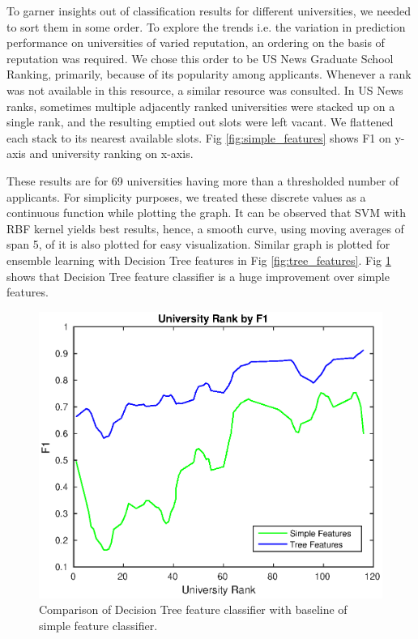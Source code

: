 \documentclass{sig-alternate-05-2015}
\begin{document}
To garner insights out of classification results for different universities, we needed to sort them in some order. To explore the trends i.e. the variation in prediction performance on universities of varied reputation, an ordering on the basis of reputation was required. We chose this order to be US News Graduate School Ranking, primarily, because of its popularity among applicants. Whenever a rank was not available in this resource, a similar resource was consulted. In US News ranks, sometimes multiple adjacently ranked universities were stacked up on a single rank, and the resulting emptied out slots were left vacant. We flattened each stack to its nearest available slots. Fig \ref{fig:simple_features} shows F1 on y-axis and university ranking on x-axis.

These results are for 69 universities having more than a thresholded number of applicants. For simplicity purposes, we treated these discrete values as a continuous function while plotting the graph. It can be observed that SVM with RBF kernel yields best results, hence, a smooth curve, using moving averages of span 5, of it is also plotted for easy visualization. Similar graph is plotted for ensemble learning with Decision Tree features in Fig \ref{fig:tree_features}. Fig \ref{fig:simple_vs_tree} shows that Decision Tree feature classifier is a huge improvement over simple features.

\begin{figure}
\centering
\includegraphics[scale=0.6]{simple_vs_tree.eps}
\caption{Comparison of Decision Tree feature classifier with baseline of simple feature classifier.}
\label{fig:simple_vs_tree}
\end{figure}
\end{document}

